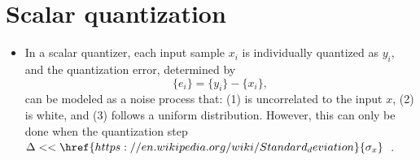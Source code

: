 \section{Scalar quantization}
\begin{itemize}
\item In a scalar quantizer, each input sample $x_i$ is individually
  quantized as $y_i$, and the quantization error, determined by
  \begin{equation*}
    \{e_i\}=\{y_i\}-\{x_i\},
  \end{equation*}
  can be modeled as a noise process that: (1) is uncorrelated to the
  input $x$, (2) is white, and (3) follows a uniform
  distribution. However, this can only be done when the quantization
  step
  $\Delta<<\href{https://en.wikipedia.org/wiki/Standard_deviation}{\sigma_x}$~\cite{vetterli1995wavelets}.

\end{itemize}

